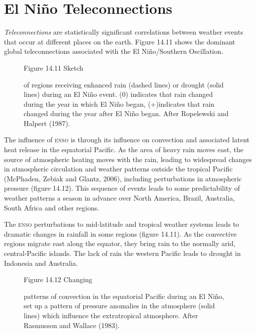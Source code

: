 \section{El Ni\~{n}o Teleconnections}
\textit{Teleconnections} are statistically significant correlations between weather e\-vents that occur at different places on the earth. Figure 14.11 shows the dominant global teleconnections associated with the El Ni\~{n}o/Southern Oscillation.

\begin{figure}[t!]
\footnotesize
Figure 14.11 Sketch \rule{0pt}{4ex}of regions receiving enhanced rain (dashed lines) or drought (solid lines) during an El Ni\~{n}o event. (0) indicates that rain changed during the year in which El Ni\~{n}o began, (+)indicates that rain changed during the year after El Ni\~{n}o began. After Ropelewski and
Halpert (1987).
\label{fig:teleconnections}
\vspace{-4ex}
\end{figure}

The influence of \textsc{enso} is
through its influence on convection and associated latent heat release in the equatorial Pacific. As the area of heavy rain moves east, the source of atmospheric heating moves with the rain, leading to widespread changes in atmospheric circulation and weather patterns outside the tropical Pacific (McPhaden, Zebiak and Glantz, 2006), including perturbations in atmospheric pressure (figure 14.12). This sequence of events leads to some predictability of weather patterns a season in advance over North America, Brazil, Australia, South Africa and other regions.

The \textsc{enso} perturbations to mid-latitude and tropical weather systems leads to dramatic changes in rainfall in some regions (figure 14.11). As the convective regions migrate east along the equator, they bring rain to the normally arid, central-Pacific islands. The lack of rain the western Pacific leads to drought in Indonesia and Australia.
\begin{figure}[h!]
\vspace{-2ex}
\footnotesize
Figure 14.12 Changing \rule{0pt}{4ex}patterns of convection in the equatorial
Pacific during an El Ni\~{n}o, set up a pattern of pressure
anomalies in the atmosphere (solid lines) which influence
the extratropical atmosphere. After Rasmusson and Wallace (1983).
\label{fig:pressureanomaly}
\vspace{-3ex}
\end{figure}

